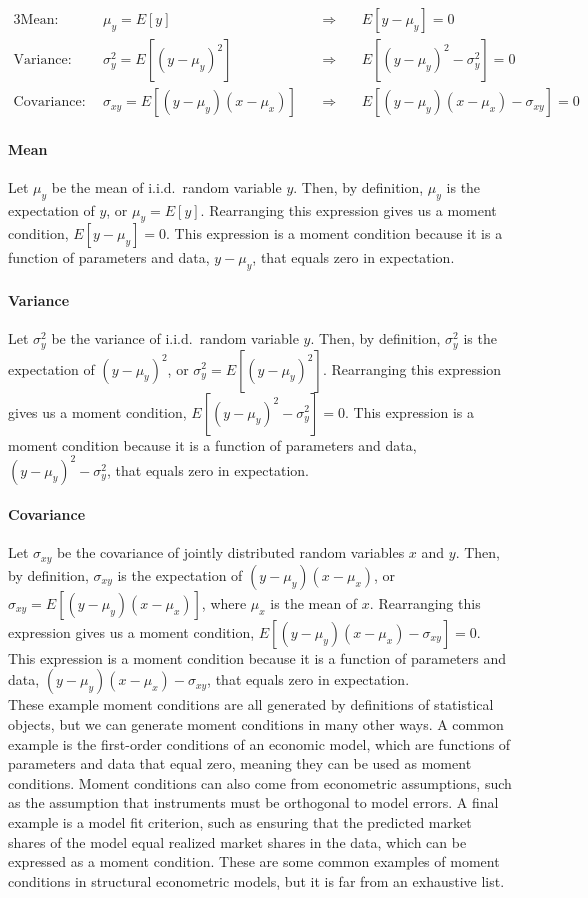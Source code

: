 \documentclass[11pt,letterpaper]{article}
\begin{document}
\begin{alignat*}{3}
	\text{Mean:} ~~ & \mu_y = E[y] ~ && \Rightarrow ~ & &E[y - \mu_y] = 0 \\
	\text{Variance:} ~~ & \sigma_y^2 = E[(y - \mu_y)^2] ~ && \Rightarrow ~ && E[ (y - \mu_y)^2 - \sigma_y^2] = 0 \\
	\text{Covariance:} ~~ & \sigma_{xy} = E[(y - \mu_y) (x - \mu_x)] ~ && \Rightarrow ~ && E[ (y - \mu_y) (x - \mu_x) - \sigma_{xy}] = 0
\end{alignat*}

\paragraph{Mean} Let $\mu_y$ be the mean of i.i.d.\ random variable $y$. Then, by definition, $\mu_y$ is the expectation of $y$, or $\mu_y = E[y]$. Rearranging this expression gives us a moment condition, $E[y - \mu_y] = 0$. This expression is a moment condition because it is a function of parameters and data, $y - \mu_y$, that equals zero in expectation.

\paragraph{Variance} Let $\sigma_y^2$ be the variance of i.i.d.\ random variable $y$. Then, by definition, $\sigma_y^2$ is the expectation of $(y - \mu_y)^2$, or $\sigma_y^2 = E[(y - \mu_y)^2]$. Rearranging this expression gives us a moment condition, $E[(y - \mu_y)^2 - \sigma_y^2] = 0$. This expression is a moment condition because it is a function of parameters and data, $(y - \mu_y)^2 - \sigma_y^2$, that equals zero in expectation.

\paragraph{Covariance} Let $\sigma_{xy}$ be the covariance of jointly distributed random variables $x$ and $y$. Then, by definition, $\sigma_{xy}$ is the expectation of $(y - \mu_y) (x - \mu_x)$, or $\sigma_{xy} = E[(y - \mu_y) (x - \mu_x)]$, where $\mu_x$ is the mean of $x$. Rearranging this expression gives us a moment condition, $E[(y - \mu_y) (x - \mu_x) - \sigma_{xy}] = 0$. This expression is a moment condition because it is a function of parameters and data, $(y - \mu_y) (x - \mu_x) - \sigma_{xy}$, that equals zero in expectation. \\

\noindent These example moment conditions are all generated by definitions of statistical objects, but we can generate moment conditions in many other ways. A common example is the first-order conditions of an economic model, which are functions of parameters and data that equal zero, meaning they can be used as moment conditions. Moment conditions can also come from econometric assumptions, such as the assumption that instruments must be orthogonal to model errors. A final example is a model fit criterion, such as ensuring that the predicted market shares of the model equal realized market shares in the data, which can be expressed as a moment condition. These are some common examples of moment conditions in structural econometric models, but it is far from an exhaustive list.
\end{document}
